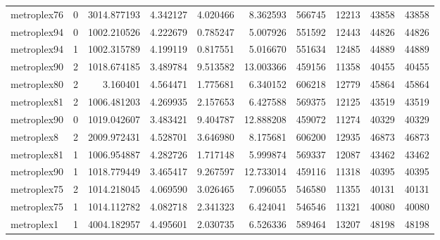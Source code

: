 \begin{longtable}{|l|r|r|r|r|r|r|r|r|r|}
metroplex76 & 0 & 3014.877193 & 4.342127 & 4.020466 & 8.362593 & 566745 & 12213 & 43858 & 43858 \\
metroplex94 & 0 & 1002.210526 & 4.222679 & 0.785247 & 5.007926 & 551592 & 12443 & 44826 & 44826 \\
metroplex94 & 1 & 1002.315789 & 4.199119 & 0.817551 & 5.016670 & 551634 & 12485 & 44889 & 44889 \\
metroplex90 & 2 & 1018.674185 & 3.489784 & 9.513582 & 13.003366 & 459156 & 11358 & 40455 & 40455 \\
metroplex80 & 2 & 3.160401 & 4.564471 & 1.775681 & 6.340152 & 606218 & 12779 & 45864 & 45864 \\
metroplex81 & 2 & 1006.481203 & 4.269935 & 2.157653 & 6.427588 & 569375 & 12125 & 43519 & 43519 \\
metroplex90 & 0 & 1019.042607 & 3.483421 & 9.404787 & 12.888208 & 459072 & 11274 & 40329 & 40329 \\
metroplex8 & 2 & 2009.972431 & 4.528701 & 3.646980 & 8.175681 & 606200 & 12935 & 46873 & 46873 \\
metroplex81 & 1 & 1006.954887 & 4.282726 & 1.717148 & 5.999874 & 569337 & 12087 & 43462 & 43462 \\
metroplex90 & 1 & 1018.779449 & 3.465417 & 9.267597 & 12.733014 & 459116 & 11318 & 40395 & 40395 \\
metroplex75 & 2 & 1014.218045 & 4.069590 & 3.026465 & 7.096055 & 546580 & 11355 & 40131 & 40131 \\
metroplex75 & 1 & 1014.112782 & 4.082718 & 2.341323 & 6.424041 & 546546 & 11321 & 40080 & 40080 \\
metroplex1 & 1 & 4004.182957 & 4.495601 & 2.030735 & 6.526336 & 589464 & 13207 & 48198 & 48198 \\
\end{longtable}
